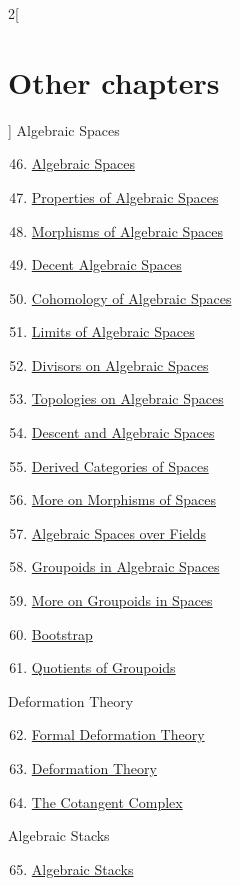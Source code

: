 \begin{multicols}{2}[\section{Other chapters}]
Algebraic Spaces
\begin{enumerate}
\setcounter{enumi}{45}
\item \hyperref[spaces-section-phantom]{Algebraic Spaces}
\item \hyperref[spaces-properties-section-phantom]{Properties of Algebraic Spaces}
\item \hyperref[spaces-morphisms-section-phantom]{Morphisms of Algebraic Spaces}
\item \hyperref[decent-spaces-section-phantom]{Decent Algebraic Spaces}
\item \hyperref[spaces-cohomology-section-phantom]{Cohomology of Algebraic Spaces}
\item \hyperref[spaces-limits-section-phantom]{Limits of Algebraic Spaces}
\item \hyperref[spaces-divisors-section-phantom]{Divisors on Algebraic Spaces}
\item \hyperref[spaces-topologies-section-phantom]{Topologies on Algebraic Spaces}
\item \hyperref[spaces-descent-section-phantom]{Descent and Algebraic Spaces}
\item \hyperref[spaces-perfect-section-phantom]{Derived Categories of Spaces}
\item \hyperref[spaces-more-morphisms-section-phantom]{More on Morphisms of Spaces}
\item \hyperref[spaces-over-fields-section-phantom]{Algebraic Spaces over Fields}
\item \hyperref[spaces-groupoids-section-phantom]{Groupoids in Algebraic Spaces}
\item \hyperref[spaces-more-groupoids-section-phantom]{More on Groupoids in Spaces}
\item \hyperref[bootstrap-section-phantom]{Bootstrap}
\item \hyperref[groupoids-quotients-section-phantom]{Quotients of Groupoids}
\end{enumerate}
Deformation Theory
\begin{enumerate}
\setcounter{enumi}{61}
\item \hyperref[formal-defos-section-phantom]{Formal Deformation Theory}
\item \hyperref[defos-section-phantom]{Deformation Theory}
\item \hyperref[cotangent-section-phantom]{The Cotangent Complex}
\end{enumerate}
Algebraic Stacks
\begin{enumerate}
\setcounter{enumi}{64}
\item \hyperref[algebraic-section-phantom]{Algebraic Stacks}

\end{enumerate}
\end{multicols}
